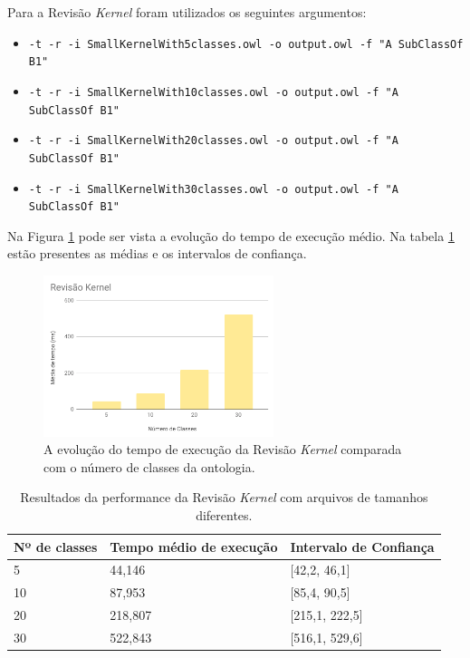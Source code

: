 Para a Revisão \textit{Kernel} foram utilizados os seguintes argumentos:

\begin{itemize}
	\item \texttt{-t -r -i SmallKernelWith5classes.owl -o output.owl -f "A SubClassOf B1"}
	\item \texttt{-t -r -i SmallKernelWith10classes.owl -o output.owl -f "A SubClassOf B1"}
	\item \texttt{-t -r -i SmallKernelWith20classes.owl -o output.owl -f "A SubClassOf B1"}
	\item \texttt{-t -r -i SmallKernelWith30classes.owl -o output.owl -f "A SubClassOf B1"}
\end{itemize}

Na Figura \ref{img:graficork} pode ser vista a evolução do tempo de execução médio. Na tabela \ref{tab:rk} estão presentes as médias e os intervalos de confiança.

\begin{figure}[H]
	\centering
	\includegraphics[width=0.6\textwidth]{Capitulos/Testes/graficork.png}
	\caption{A evolução do tempo de execução da Revisão \textit{Kernel} comparada com o número de classes da ontologia.}
	\label{img:graficork}
\end{figure}

\begin{table}[H]
	\centering
	\begin{tabular}{|l|l|l|}
		\hline
		\textbf{Nº de classes}  & \textbf{Tempo médio de execução} & \textbf{Intervalo de Confiança} \\ \hline
		5                                                  & 44,146                          & {[}42,2, 46,1{]}              \\ \hline
		10                                                  & 87,953                          & {[}85,4, 90,5{]}              \\ \hline
		20                                                  & 218,807                          & {[}215,1, 222,5{]}              \\ \hline
		30                                                 & 522,843                          & {[}516,1, 529,6{]}              \\ \hline
	\end{tabular}
	\caption{Resultados da performance da Revisão \textit{Kernel} com arquivos de tamanhos diferentes.}
	\label{tab:rk}
\end{table}

